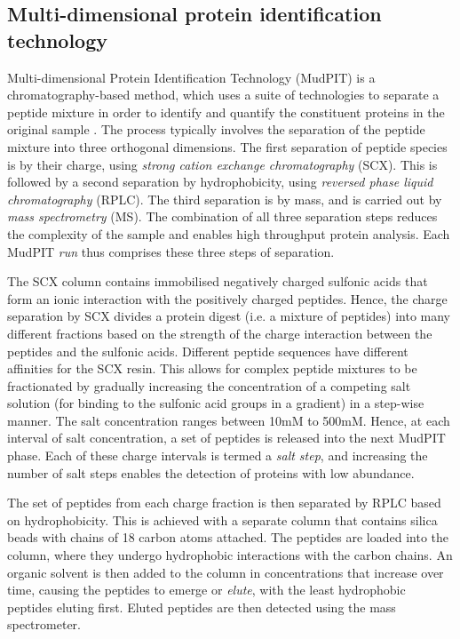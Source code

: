 \subsection{Multi-dimensional protein identification technology} \label{subsec:MudPIT}
Multi-dimensional Protein Identification Technology (MudPIT) is a chromatography-based method, which uses a suite of technologies to separate a peptide mixture in order to identify and quantify the constituent proteins in the original sample \citep{Washburn2001}. The process typically involves the separation of the peptide mixture into three orthogonal dimensions. The first separation of peptide species is by their charge, using \emph{strong cation exchange chromatography} (SCX). This is followed by a second separation by hydrophobicity, using \emph{reversed phase liquid chromatography} (RPLC). The third separation is by mass, and is carried out by \emph{mass spectrometry} (MS). The combination of all three separation steps reduces the complexity of the sample and enables high throughput protein analysis. Each MudPIT \emph{run} thus comprises these three steps of separation.

The SCX column contains immobilised negatively charged sulfonic acids that form an ionic interaction with the positively charged peptides. Hence, the charge separation by SCX divides a protein digest (i.e. a mixture of peptides) into many different fractions based on the strength of the charge interaction between the peptides and the sulfonic acids. Different peptide sequences have different affinities for the SCX resin. This allows for complex peptide mixtures to be fractionated by gradually increasing the concentration of a competing salt solution (for binding to the sulfonic acid groups in a gradient) in a step-wise manner. The salt concentration ranges between 10mM to 500mM. Hence, at each interval of salt concentration, a set of peptides is released into the next MudPIT phase. Each of these charge intervals is termed a \emph{salt step}, and increasing the number of salt steps enables the detection of proteins with low abundance. 

The set of peptides from each charge fraction is then separated by RPLC based on hydrophobicity. This is achieved with a separate column that contains silica beads with chains of 18 carbon atoms attached. The peptides are loaded into the column, where they undergo hydrophobic interactions with the carbon chains. An organic solvent is then added to the column in concentrations that increase over time, causing the peptides to emerge or \emph{elute}, with the least hydrophobic peptides eluting first. Eluted peptides are then detected using the mass spectrometer.

